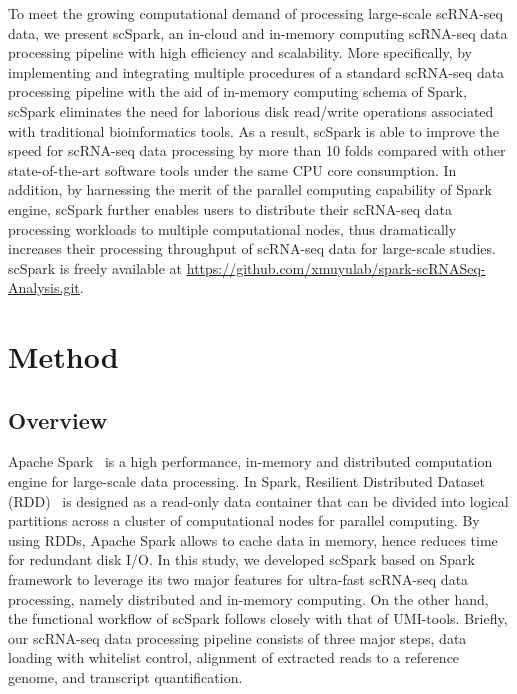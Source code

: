 \documentclass[conference]{IEEEtran}
\begin{document}
To meet the growing computational demand of processing large-scale scRNA-seq data, we present scSpark, an in-cloud and in-memory computing scRNA-seq data processing pipeline with high efficiency and scalability. 
More specifically, by implementing and integrating multiple procedures of a standard scRNA-seq data processing pipeline with the aid of in-memory computing schema of Spark, scSpark eliminates the need for laborious disk read/write operations associated with traditional bioinformatics tools. 
As a result, scSpark is able to improve the speed for scRNA-seq data processing by more than 10 folds compared with other state-of-the-art software tools under the same CPU core consumption. In addition, by harnessing the merit of the parallel computing capability of Spark engine, scSpark further enables users to distribute their scRNA-seq data processing workloads to multiple computational nodes, thus dramatically increases their processing throughput of scRNA-seq data for large-scale studies. 
scSpark is freely available at \url{https://github.com/xmuyulab/spark-scRNASeq-Analysis.git}.

\section{Method}
\subsection{Overview}
Apache Spark~\cite{zaharia2010spark} is a high performance, in-memory and distributed computation engine for large-scale data processing. 
In Spark, Resilient Distributed Dataset (RDD)~\cite{Zaharia2012Resilient} is designed as a read-only data container that can be divided into logical partitions across a cluster of computational nodes for parallel computing. 
By using RDDs, Apache Spark allows to cache data in memory, hence reduces time for redundant disk I/O.
In this study, we developed scSpark based on Spark framework to leverage its two major features for ultra-fast scRNA-seq data processing, namely distributed and in-memory computing. 
On the other hand, the functional workflow of scSpark follows closely with that of UMI-tools.
Briefly, our scRNA-seq data processing pipeline consists of three major steps, data loading with whitelist control, alignment of extracted reads to a reference genome, and transcript quantification. 
\end{document}

